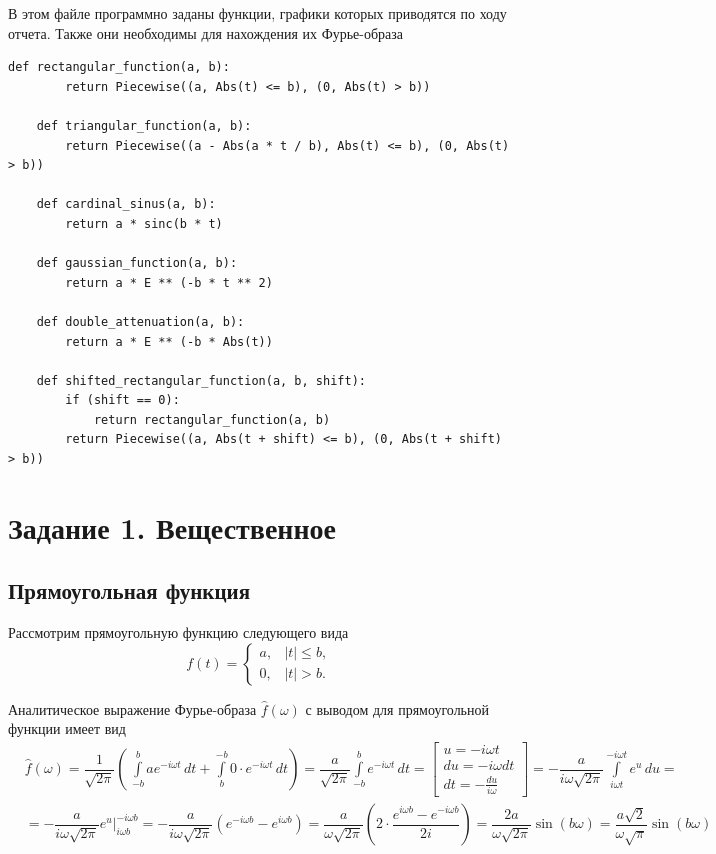 \documentclass[a4paper, 16pt]{article}
\begin{document}
    \noindent В этом файле программно заданы функции, графики которых приводятся по ходу отчета. Также они необходимы
    для нахождения их Фурье-образа
    \begin{lstlisting}[label=funcs, caption=Программно заданные функции для заданий 1 и 2]
    def rectangular_function(a, b):
        return Piecewise((a, Abs(t) <= b), (0, Abs(t) > b))

    def triangular_function(a, b):
        return Piecewise((a - Abs(a * t / b), Abs(t) <= b), (0, Abs(t) > b))

    def cardinal_sinus(a, b):
        return a * sinc(b * t)
    
    def gaussian_function(a, b):
        return a * E ** (-b * t ** 2)
    
    def double_attenuation(a, b):
        return a * E ** (-b * Abs(t))

    def shifted_rectangular_function(a, b, shift):
        if (shift == 0):
            return rectangular_function(a, b)
        return Piecewise((a, Abs(t + shift) <= b), (0, Abs(t + shift) > b))
    \end{lstlisting}


    \section{Задание 1. Вещественное}
    \subsection{Прямоугольная функция}
    \noindent Рассмотрим прямоугольную функцию следующего вида
    $$
    f(t)=
    \begin{cases}
        a, & \left|t\right|\leq b,\\
        0, & \left|t\right|>b.
    \end{cases}
    $$


    \noindent Аналитическое выражение Фурье-образа $\hat{f}(\omega)$
    с выводом для прямоугольной функции имеет вид
    \begin{align*}
        & \hat{f}(\omega)=\dfrac{1}{\sqrt{2\pi}}\left(\,\int\limits_{-b}^{b}ae^{-i\omega t}\,dt+\int\limits_{b}^{-b}0\cdot e^{-i\omega t}\,dt\right)=
        \dfrac{a}{\sqrt{2\pi}}\int\limits_{-b}^{b}e^{-i\omega t}\,dt=
        \begin{bmatrix}
            u=-i\omega t\\
            du=-i\omega dt\\
            dt=-\frac{du}{i\omega}
        \end{bmatrix}=
        -\dfrac{a}{i\omega \sqrt{2\pi}}\int\limits_{i\omega t}^{-i\omega t}e^{u}\,du=\\
        & =-\dfrac{a}{i\omega \sqrt{2\pi}}e^{u}\bigg|_{i\omega b}^{-i\omega b}=
        -\dfrac{a}{i\omega \sqrt{2\pi}}\left(e^{-i\omega b}-e^{i\omega b}\right)=\dfrac{a}{\omega \sqrt{2\pi}}\left(2\cdot\dfrac{e^{i\omega b}-e^{-i\omega b}}{2i}\right)=
        \dfrac{2a}{\omega \sqrt{2\pi}}\sin{(b\omega)}=\dfrac{a\sqrt{2}}{\omega\sqrt{\pi}}\sin{(b\omega)}
    \end{align*}
\end{document}
